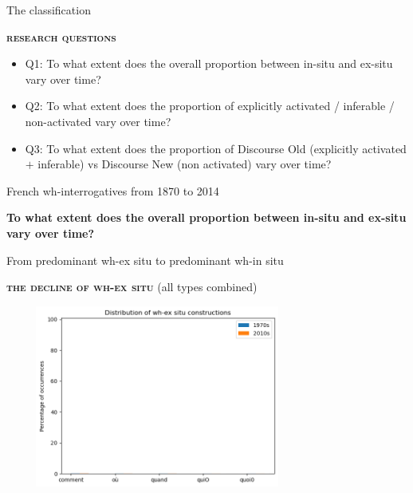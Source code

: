 \documentclass[lesson_slides]{subfiles}
\begin{document}
\begin{frame}{The classification}

    \textbf{\textsc{research questions}} \pause 
    \begin{itemize}
        \item[\ding{227}] Q1:  \pause To what extent does the overall proportion between in-situ and ex-situ vary over time? \pause
        \item[\ding{227}] Q2: \pause To what extent does the proportion of explicitly activated / inferable / non-activated vary over time? \pause
        \item[\ding{227}] Q3: \pause To what extent does the proportion of Discourse Old (explicitly activated $+$ inferable) vs Discourse New (non activated) vary over time?
    \end{itemize}

\end{frame}
\begin{frame}[c]{French wh-interrogatives from 1870 to 2014}

    \begin{center}
        \textbf{To what extent does the overall proportion between in-situ and ex-situ vary over time?}
    \end{center}
  
\end{frame}
\begin{frame}[c]{From predominant wh-ex situ to predominant wh-in situ}

    \textbf{\textsc{the decline of wh-ex situ}} \pause (all types combined) \pause
    \begin{center}
        \includegraphics[width=10cm, height=6cm]{images/exsituempty.png}
    \end{center}
  
\end{frame}
\end{document}
